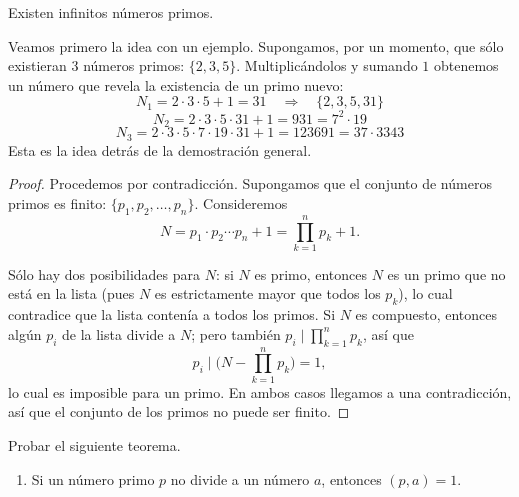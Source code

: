 \documentclass[12pt,a4paper]{book}
\begin{document}
  \begin{teorema}
    Existen infinitos números primos.
  \end{teorema}
  
  Veamos primero la idea con un ejemplo. Supongamos, por un momento, que sólo existieran 3 números primos: $\{2,3,5\}$. Multiplicándolos y sumando $1$ obtenemos un número que revela la existencia de un primo nuevo:
  \begin{equation*}
    N_1 = 2\cdot 3\cdot 5+1 = 31 \quad \Longrightarrow \quad \{2,3,5,31\}
  \end{equation*}
  \begin{equation*}
    N_2 = 2\cdot 3\cdot 5\cdot 31+1 = 931 = 7^2 \cdot 19
  \end{equation*}
  \begin{equation*}
    N_3 = 2\cdot 3\cdot 5\cdot 7\cdot 19\cdot 31+1 = 123691 = 37\cdot 3343
  \end{equation*}
  Esta es la idea detrás de la demostración general.
  
  \begin{proof}
    Procedemos por contradicción. Supongamos que el conjunto de números primos es finito: $\{p_1,p_2,\dots,p_n\}$. Consideremos
    \begin{equation*}
      N = p_1\cdot p_2 \cdots p_n + 1 = \prod_{k=1}^{n} p_k + 1.
    \end{equation*}
  
    Sólo hay dos posibilidades para $N$: si $N$ es primo, entonces $N$ es un primo que no está en la lista (pues $N$ es estrictamente mayor que todos los $p_k$), lo cual contradice que la lista contenía a todos los primos. Si $N$ es compuesto, entonces algún $p_i$ de la lista divide a $N$; pero también $p_i \mid \prod_{k=1}^n p_k$, así que
    \begin{equation*}
      p_i \;\Big|\; \Big(N - \prod_{k=1}^n p_k\Big) = 1,
    \end{equation*}
    lo cual es imposible para un primo. En ambos casos llegamos a una contradicción, así que el conjunto de los primos no puede ser finito.
  \end{proof}
  
  \begin{ejemplo}
    Probar el siguiente teorema.
    \begin{enumerate}[label=\roman*)]
      \item Si un número primo $p$ no divide a un número $a$, entonces $(p,a)=1$.
    \end{enumerate}
  \end{ejemplo}
  
\end{document}
